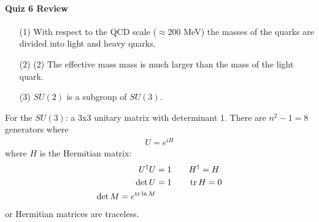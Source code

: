 \documentclass[../main.tex]{subfiles}
\begin{document}
\paragraph{Quiz 6 Review}
\begin{itemize}
    \item [(1)] With respect to the QCD scale ($\approx 200$ MeV) the masses of the quarks are
    divided into light and heavy quarks.
    \item [(2)] (2) The effective mass mass is much larger than the mass of the light quark.
    \item [(3)] $SU(2)$ is a subgroup of $SU(3)$.
\end{itemize}

For the $SU(3)$: a 3x3 unitary matrix with determinant 1. There are $n^2 - 1 = 8$ generators where
\begin{align*}
    U = e^{iH}
\end{align*}
where $H$ is the Hermitian matrix:
\begin{align*}
    U^\dagger U &= 1 \qquad H^\dagger = H \\
    \det U &= 1 \qquad \trace H = 0 \\
    \det M = e^{\trace \ln M}
\end{align*}
or Hermitian matrices are traceless. 
\end{document}
